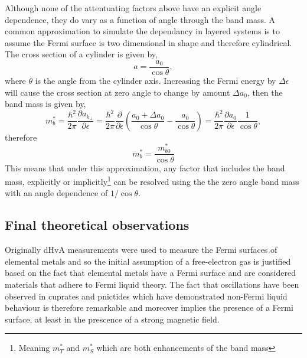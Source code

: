 Although none of the attentuating factors above have an explicit angle dependence, they do vary as a function of angle through the band mass. A common approximation to simulate the dependancy in layered systems is to assume the Fermi surface is two dimensional in shape and therefore cylindrical. The cross section of a cylinder is given by,
\begin{equation}
    a = \frac{a_0}{\cos \theta},
\end{equation}
where $\theta$ is the angle from the cylinder axis. Increasing the Fermi energy by $\Delta \epsilon$ will cause the cross section at zero angle to change by amount $\Delta a_0$, then the band mass is given by,
\begin{equation}
    m^*_b = \frac{\hbar^2}{2\pi}\frac{\partial a_{k_\perp}}{\partial \epsilon} = \frac{\hbar^2}{2\pi}\frac{\partial}{\partial \epsilon}\left(\frac{a_0 + \Delta a_0 }{\cos\theta} - \frac{a_0 }{\cos\theta}\right) = \frac{\hbar^2}{2\pi}\frac{\partial a_0}{\partial \epsilon}\frac{1}{\cos \theta},
\end{equation}
therefore
\begin{equation}
    m^*_b = \frac{m^*_{b0} }{\cos{\theta}}
\end{equation}
This means that under this approximation, any factor that includes the band mass, explicitly or implicitly\footnote{Meaning $m^*_T$ and $m^*_S$ which are both enhancements of the band mass} can be resolved using the the zero angle band mass with an angle dependence of $1/\cos{\theta}$.

\subsection{Final theoretical observations}

Originally \ac{dHvA} measurements were used to measure the Fermi surfaces of elemental metals and so the initial assumption of a free-electron gas is justified based on the fact that elemental metals have a Fermi surface and are considered materials that adhere to Fermi liquid theory. The fact that oscillations have been observed in cuprates and pnictides which have demonstrated non-Fermi liquid behaviour is therefore remarkable and moreover implies the presence of a Fermi surface, at least in the prescence of a strong magnetic field.

